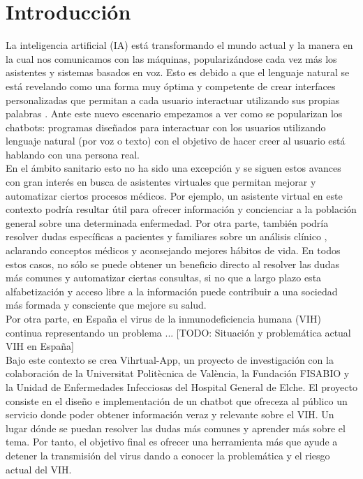 \section{Introducción}
La inteligencia artificial (IA) está transformando el mundo actual y la manera en la cual nos comunicamos con las máquinas, popularizándose cada vez más los asistentes y sistemas basados en voz. Esto es debido a que el lenguaje natural se está revelando como una forma muy óptima y competente de crear interfaces personalizadas que permitan a cada usuario interactuar utilizando sus propias palabras \cite{naturalDialogue} . Ante este nuevo escenario empezamos a ver como se popularizan los chatbots: programas diseñados para interactuar con los usuarios utilizando lenguaje natural (por voz o texto) con el objetivo de hacer creer al usuario está hablando con una persona real. \\

En el ámbito sanitario esto no ha sido una excepción y se siguen estos avances con gran interés en busca de asistentes virtuales que permitan mejorar y automatizar ciertos procesos médicos\cite{healthAgents}. Por ejemplo, un asistente virtual en este contexto podría resultar útil para ofrecer información y concienciar a la población general sobre una determinada enfermedad. Por otra parte, también podría resolver dudas específicas a pacientes y familiares sobre un análisis clínico \cite{healthAgents}, aclarando conceptos médicos y aconsejando mejores hábitos de vida. En todos estos casos, no sólo se puede obtener un beneficio directo al resolver las dudas más comunes y automatizar ciertas consultas, si no que a largo plazo esta alfabetización y acceso libre a la información puede contribuir a una sociedad más formada y consciente que mejore su salud.\\

Por otra parte, en España el virus de la inmunodeficiencia humana (VIH) continua representando un problema ... [TODO: Situación y problemática actual VIH en España]\\

Bajo este contexto se crea Vihrtual-App, un proyecto de investigación con la colaboración de la Universitat Politècnica de València, la Fundación FISABIO y la Unidad de Enfermedades Infecciosas del Hospital General de Elche. El proyecto consiste en el diseño e implementación de un chatbot que ofreceza al público un servicio donde poder obtener información veraz y relevante sobre el VIH. Un lugar dónde se puedan resolver las dudas más comunes y aprender más sobre el tema. Por tanto, el objetivo final es ofrecer una herramienta más que ayude a detener la transmisión del virus dando a conocer la problemática y el riesgo actual del VIH.\\ %

